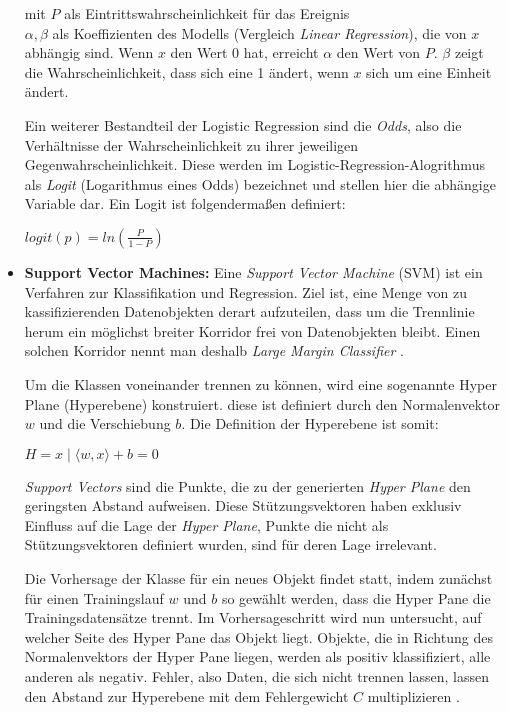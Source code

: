 \begin{itemize}
mit \(P\) als Eintrittswahrscheinlichkeit für das Ereignis \\
\(\alpha, \beta\) als Koeffizienten des Modells (Vergleich \textit{Linear Regression}), die von \(x\) abhängig sind. Wenn \(x\) den Wert 0 hat, erreicht \(\alpha\) den Wert von \(P\). \(\beta\) zeigt die Wahrscheinlichkeit, dass sich eine 1 ändert, wenn \(x\) sich um eine Einheit ändert.

Ein weiterer Bestandteil der Logistic Regression sind die \textit{Odds}, also die Verhältnisse der Wahrscheinlichkeit zu ihrer jeweiligen Gegenwahrscheinlichkeit. Diese werden im Logistic-Regression-Alogrithmus als \textit{Logit} (Logarithmus eines Odds) bezeichnet und stellen hier die abhängige Variable dar. 
Ein Logit ist folgendermaßen definiert: 

\(logit(p) = ln( \frac{P}{1-P})\)

\item \textbf{Support Vector Machines:} Eine \textit{Support Vector Machine} (SVM) ist ein Verfahren zur Klassifikation und Regression. Ziel ist, eine Menge von zu kassifizierenden Datenobjekten derart aufzuteilen, dass um die Trennlinie herum ein möglichst breiter Korridor frei von Datenobjekten bleibt. Einen solchen Korridor nennt man deshalb \textit{Large Margin Classifier} .

Um die Klassen voneinander trennen zu können, wird eine sogenannte Hyper Plane (Hyperebene) konstruiert. diese ist definiert durch den Normalenvektor \(w\) und die Verschiebung \(b\). Die Definition der Hyperebene ist somit: 

\(H = {x \mid \langle w,x \rangle+b=0}\)

\textit{Support Vectors} sind die Punkte, die zu der generierten \textit{Hyper Plane} den geringsten Abstand aufweisen. Diese Stützungsvektoren haben exklusiv Einfluss auf die Lage der \textit{Hyper Plane}, Punkte die nicht als Stützungsvektoren definiert wurden, sind für deren Lage irrelevant.  

Die Vorhersage der Klasse für ein neues Objekt findet statt, indem zunächst für einen Trainingslauf \(w\) und \(b\) so gewählt werden, dass die Hyper Pane die Trainingsdatensätze trennt. Im Vorhersageschritt wird nun untersucht, auf welcher Seite des Hyper Pane das Objekt liegt. Objekte, die in Richtung des Normalenvektors der Hyper Pane liegen, werden als positiv klassifiziert, alle anderen als negativ. Fehler, also Daten, die sich nicht trennen lassen, lassen den Abstand zur Hyperebene mit dem Fehlergewicht \(C\) multiplizieren .  


\end{itemize}
